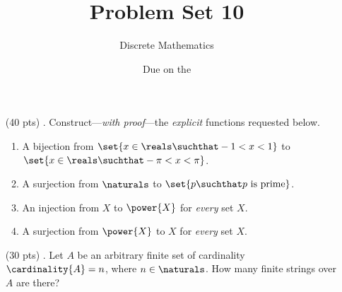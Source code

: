 

\title{Problem Set 10}
\author[Daniel Gonzalez Cedre]{Discrete Mathematics}
\date{Due on the }



\maketitle

\begin{enumerate}
  \item[(40 pts) \quad 1.]
    Construct---\emph{with proof}---the \emph{explicit} functions requested below.
    \begin{enumerate}
      \item
        A bijection from $\set{x \in \reals \suchthat -1 < x < 1}$ to $\set{x \in \reals \suchthat -\pi < x < \pi}$.
      \item
        A surjection from $\naturals$ to $\set{p \suchthat p \text{ is prime}}$.
      \item
        An injection from $X$ to $\power{X}$ for \emph{every} set $X$.
      \item
        A surjection from $\power{X}$ to $X$ for \emph{every} set $X$.
    \end{enumerate}


  \item[(30 pts) \quad 2.]
    Let $A$ be an arbitrary finite set of cardinality $\cardinality{A} = n$, where $n \in \naturals$.
    How many finite strings over $A$ are there?


\end{enumerate}
